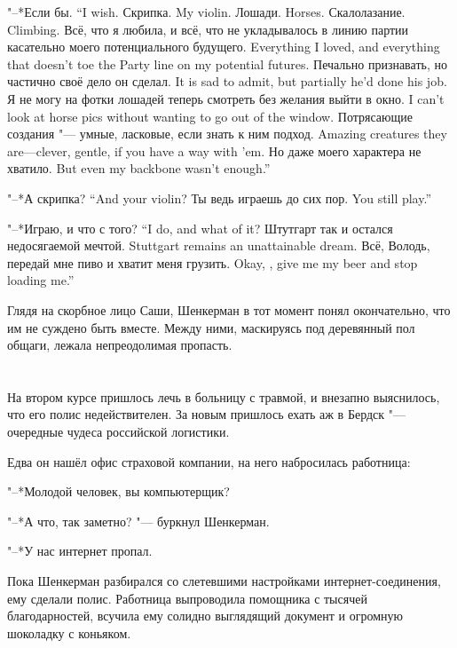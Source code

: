 {"--*Если бы.}
{``I wish.}
{Скрипка.}
{My violin.}
{Лошади.}
{Horses.}
{Скалолазание.}
{Climbing.}
{Всё, что я любила, и всё, что не укладывалось в линию партии касательно моего потенциального будущего.}
{Everything I loved, and everything that doesn't toe the Party line on my potential futures.}
{Печально признавать, но частично своё дело он сделал.}
{It is sad to admit, but partially he'd done his job.}
{Я не могу на фотки лошадей теперь смотреть без желания выйти в окно.}
{I can't look at horse pics without wanting to go out of the window.}
{Потрясающие создания "--- умные, ласковые, если знать к ним подход.}
{Amazing creatures they are---clever, gentle, if you have a way with 'em.}
{Но даже моего характера не хватило.}
{But even my backbone wasn't enough.''}

{"--*А скрипка?}
{``And your violin?}
{Ты ведь играешь до сих пор.}
{You still play.''}

{"--*Играю, и что с того?}
{``I do, and what of it?}
{Штутгарт так и остался недосягаемой мечтой.}
{Stuttgart remains an unattainable dream.}
{Всё, Володь, передай мне пиво и хватит меня грузить.}
{Okay, \Volod, give me my beer and stop loading me.''}

Глядя на скорбное лицо Саши, Шенкерман в тот момент понял окончательно, что им не суждено быть вместе.
Между ними, маскируясь под деревянный пол общаги, лежала непреодолимая пропасть.

\chapter{}

\textspace

На втором курсе пришлось лечь в больницу с травмой, и внезапно выяснилось, что его полис недействителен.
За новым пришлось ехать аж в Бердск "--- очередные чудеса российской логистики.

Едва он нашёл офис страховой компании, на него набросилась работница:

"--*Молодой человек, вы компьютерщик?

"--*А что, так заметно? "--- буркнул Шенкерман.

"--*У нас интернет пропал.

Пока Шенкерман разбирался со слетевшими настройками интернет-соединения, ему сделали полис.
Работница выпроводила помощника с тысячей благодарностей, всучила ему солидно выглядящий документ и огромную шоколадку с коньяком.

